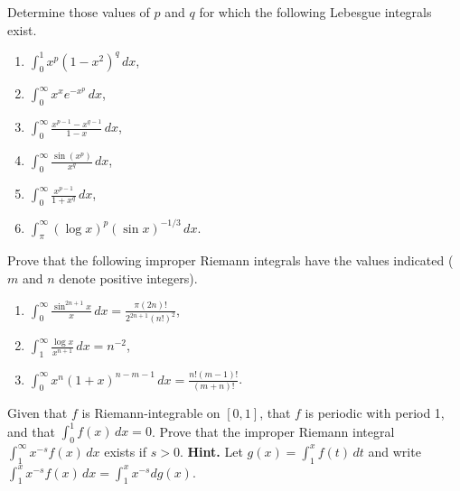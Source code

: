 \begin{problembox}
Determine those values of $p$ and $q$ for which the following Lebesgue integrals exist.
\begin{enumerate}[label=(\alph*)]
    \item $\int_{0}^{1} x^p (1 - x^2)^q \, dx$,
    \item $\int_{0}^{\infty} x^x e^{-x^p} \, dx$,
    \item $\int_{0}^{\infty} \frac{x^{p-1} - x^{q-1}}{1 - x} \, dx$,
    \item $\int_{0}^{\infty} \frac{\sin(x^p)}{x^q} \, dx$,
    \item $\int_{0}^{\infty} \frac{x^{p-1}}{1 + x^q} \, dx$,
    \item $\int_{\pi}^{\infty} (\log x)^p (\sin x)^{-1/3} \, dx$.
\end{enumerate}
\end{problembox}

\begin{problembox}
Prove that the following improper Riemann integrals have the values indicated ($m$ and $n$ denote positive integers).
\begin{enumerate}[label=(\alph*)]
    \item $\int_{0}^{\infty} \frac{\sin^{2n+1} x}{x} \, dx = \frac{\pi(2n)!}{2^{2n+1}(n!)^2}$,
    \item $\int_{1}^{\infty} \frac{\log x}{x^{n+1}} \, dx = n^{-2}$,
    \item $\int_{0}^{\infty} x^n (1 + x)^{n-m-1} \, dx = \frac{n!(m-1)!}{(m+n)!}$.
\end{enumerate}
\end{problembox}

\begin{problembox}
Given that $f$ is Riemann-integrable on $[0, 1]$, that $f$ is periodic with period 1, and that $\int_{0}^{1} f(x) \, dx = 0$. Prove that the improper Riemann integral $\int_{1}^{\infty} x^{-s} f(x) \, dx$ exists if $s > 0$. \textbf{Hint.} Let $g(x) = \int_{1}^{x} f(t) \, dt$ and write $\int_{1}^{x} x^{-s} f(x) \, dx = \int_{1}^{x} x^{-s} dg(x)$.
\end{problembox}

